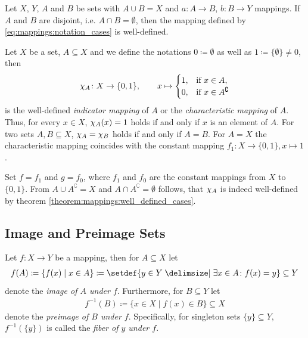 \begin{remarks}
    \begin{remarkenumerate}
        \item\label{remark:mappings:well_defined_cases_disjoint} Let $X$, $Y$, $A$ and $B$ be sets with $A\cup B=X$ and $a\colon A\to B$, $b\colon B\to Y$ mappings. If $A$ and $B$ are disjoint, i.e. $A\cap B=\emptyset$, then the mapping defined by \ref{eq:mappings:notation_cases} is well-defined.
    \end{remarkenumerate}
\end{remarks}

\begin{examples}
    \begin{exampleenumerate}
        \item Let $X$ be a set, $A\subseteq X$ and we define the notations $0\coloneq\emptyset$ as well as $1\coloneq\{\emptyset\}\neq 0$, then \begin{align}\chi_A\colon X\rightarrow \{0,1\},\qquad x\mapsto\begin{cases}1,& \text{if } x\in A,\\ 0,& \text{if } x\in A^\complement\end{cases}\end{align}
        is the well-defined \emph{indicator mapping} of $A$ or the \emph{characteristic mapping} of $A$. Thus, for every $x\in X$, $\chi_A(x)=1$ holds if and only if $x$ is an element of $A$. For two sets $A,B\subseteq X$, $\chi_A=\chi_B$ holds if and only if $A=B$. For $A=X$ the characteristic mapping coincides with the constant mapping $f_1\colon X\rightarrow\{0,1\},x\mapsto 1$.
        \begin{miniproof}
            Set $f=f_1$ and $g=f_0$, where $f_1$ and $f_0$ are the constant mappings from $X$ to $\{0,1\}$. From $A\cup A^\complement=X$ and $A\cap A^\complement=\emptyset$ follows, that $\chi_A$ is indeed well-defined by theorem \ref{theorem:mappings:well_defined_cases}.
        \end{miniproof}

    \end{exampleenumerate}
\end{examples}

\subsection{Image and Preimage Sets}

\begin{definition}
    Let $f\colon X\rightarrow Y$ be a mapping, then for $A\subseteq X$ let
    \begin{align}f(A)\coloneq\{f(x) \mid x\in A\}\coloneq\setdef{y\in Y\given \exists x\in A\colon f(x)=y}\subseteq Y\end{align}
    denote the \emph{image of $A$ under $f$}. Furthermore, for $B\subseteq Y$ let
    \begin{align}f^{-1}(B)\coloneq\{x\in X \mid f(x)\in B\}\subseteq X\end{align}
    denote the \emph{preimage of $B$ under $f$}. Specifically, for singleton sets $\{y\}\subseteq Y$, $f^{-1}(\{y\})$ is called the \emph{fiber of $y$ under $f$}.
\end{definition}

